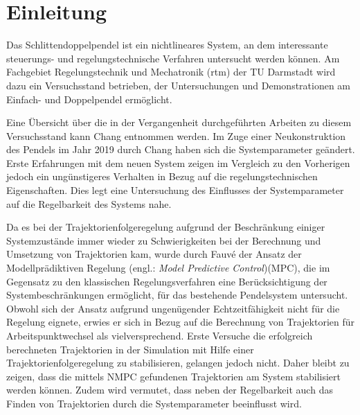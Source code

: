 \chapter{Einleitung}\label{cha:intro}

Das Schlittendoppelpendel ist ein nichtlineares System, an dem interessante steuerungs- und regelungstechnische Verfahren untersucht werden können. 
Am Fachgebiet Regelungstechnik und Mechatronik (rtm) der TU Darmstadt wird dazu ein Versuchsstand betrieben, der Untersuchungen und Demonstrationen am Einfach- und Doppelpendel ermöglicht. 

Eine Übersicht über die in der Vergangenheit durchgeführten Arbeiten zu diesem Versuchsstand kann Chang \cite{chang} entnommen werden. Im Zuge einer Neukonstruktion des Pendels im Jahr 2019 durch Chang \cite{chang} haben sich die Systemparameter geändert. Erste Erfahrungen mit dem neuen System zeigen im Vergleich zu den Vorherigen jedoch ein ungünstigeres Verhalten in Bezug auf die regelungstechnischen Eigenschaften. Dies legt eine Untersuchung des Einflusses der Systemparameter auf die Regelbarkeit des Systems nahe.

Da es bei der Trajektorienfolgeregelung aufgrund der Beschränkung einiger Systemzustände immer wieder zu Schwierigkeiten bei der Berechnung und Umsetzung von Trajektorien kam, wurde durch Fauvé \cite{fauve} der Ansatz der Modellprädiktiven Regelung (engl.: \textit{Model Predictive Control})(MPC), die im Gegensatz zu den klassischen Regelungsverfahren eine Berücksichtigung der Systembeschränkungen ermöglicht, für das bestehende Pendelsystem untersucht. Obwohl sich der Ansatz aufgrund ungenügender Echtzeitfähigkeit nicht für die Regelung eignete, erwies er sich in Bezug auf die Berechnung von Trajektorien für Arbeitspunktwechsel als vielversprechend. Erste Versuche die erfolgreich berechneten Trajektorien in der Simulation mit Hilfe einer Trajektorienfolgeregelung zu stabilisieren, gelangen jedoch nicht. Daher bleibt zu zeigen, dass die mittels NMPC gefundenen Trajektorien am System stabilisiert werden können. Zudem wird vermutet, dass neben der Regelbarkeit auch das Finden von Trajektorien durch die Systemparameter beeinflusst wird. 

